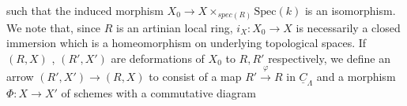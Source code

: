 such that the induced morphism $X_0 \to X \times_{spec(R)} \mathrm{Spec}(k)$ is an isomorphism. We note that, since $R$ is an artinian local ring, $i_X : X_0 \to X$ is necessarily a closed immersion which is a homeomorphism on underlying topological spaces. If $(R, X)$ , $(R', X')$ are deformations of $X_0$ to $R, R'$ respectively, we define an arrow $(R', X') \to (R, X)$ to consist of a map $R' \xrightarrow{\ \varphi\ } R$ in $\underline{C}_\Lambda$ and a morphism $\Phi : X \to X'$ of schemes with a commutative diagram

